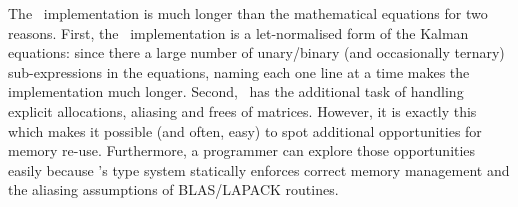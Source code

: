 The \lang\ implementation is much longer than the mathematical equations for
two reasons. First, the \lang\ implementation is a let-normalised form of the
Kalman equations: since there a large number of unary/binary (and occasionally
ternary) sub-expressions in the equations, naming each one line at a time makes
the implementation much longer.  Second, \lang\ has the additional task of
handling explicit allocations, aliasing and frees of matrices. However, it is
exactly this which makes it possible (and often, easy) to spot additional
opportunities for memory re-use. Furthermore, a programmer can explore those
opportunities easily because \lang's type system statically enforces correct
memory management and the aliasing assumptions of BLAS/LAPACK routines.

